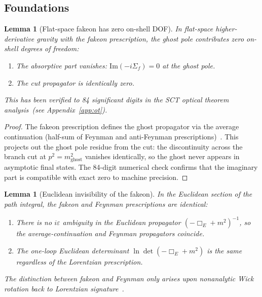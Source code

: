 \documentclass[11pt,a4paper]{article}
\theoremstyle{plain}
\newtheorem{lemma}[theorem]{Lemma}
\theoremstyle{definition}
\begin{document}
\subsection{Foundations}\label{sec:fakeon_foundations}

\begin{lemma}[Flat-space fakeon has zero on-shell DOF]%
\label{lem:fakeon_flat}
  In flat-space higher-derivative gravity with the fakeon prescription,
  the ghost pole contributes zero on-shell degrees of freedom:
  \begin{enumerate}[label=\textup{(\alph*)}]
    \item The absorptive part vanishes:
      $\mathrm{Im}(-i\Sigma_f) = 0$ at the ghost pole.
    \item The cut propagator is identically zero.
  \end{enumerate}
  This has been verified to 84 significant digits in the SCT optical
  theorem analysis~(see Appendix~\ref{app:ot}).
\end{lemma}

\begin{proof}
  The fakeon prescription defines the ghost propagator via the
  average continuation (half-sum of Feynman and anti-Feynman
  prescriptions)~\cite{AnselmiFakeon,Anselmi2020quest}.  This
  projects out the ghost pole residue from the cut: the discontinuity
  across the branch cut at $p^2 = m_{\mathrm{ghost}}^2$ vanishes
  identically, so the ghost never appears in asymptotic final states.
  The 84-digit numerical check confirms that the imaginary part is
  compatible with exact zero to machine precision.
\end{proof}

\begin{lemma}[Euclidean invisibility of the fakeon]%
\label{lem:fakeon_euclidean}
  In the Euclidean section of the path integral, the
  fakeon and Feynman prescriptions are identical:
  \begin{enumerate}[label=\textup{(\alph*)}]
    \item There is no $i\varepsilon$ ambiguity in the Euclidean
      propagator $(-\Box_E + m^2)^{-1}$, so the average-continuation
      and Feynman propagators coincide.
    \item The one-loop Euclidean determinant
      $\ln\det(-\Box_E + m^2)$ is the same regardless of the
      Lorentzian prescription.
  \end{enumerate}
  The distinction between fakeon and Feynman only arises upon
  nonanalytic Wick rotation back to Lorentzian
  signature~\cite{AnselmiFakeon}.
\end{lemma}
\end{document}
